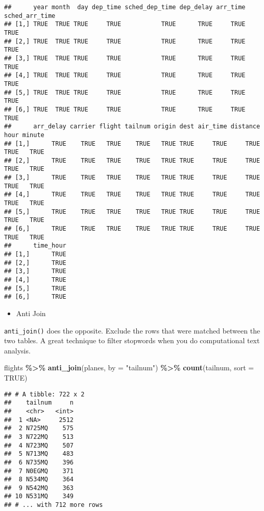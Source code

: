 \documentclass[
]{book}
\newenvironment{Shaded}{\begin{snugshade}}{\end{snugshade}}
\newcommand{\DataTypeTok}[1]{\textcolor[rgb]{0.13,0.29,0.53}{#1}}
\newcommand{\KeywordTok}[1]{\textcolor[rgb]{0.13,0.29,0.53}{\textbf{#1}}}
\newcommand{\NormalTok}[1]{#1}
\newcommand{\OperatorTok}[1]{\textcolor[rgb]{0.81,0.36,0.00}{\textbf{#1}}}
\newcommand{\OtherTok}[1]{\textcolor[rgb]{0.56,0.35,0.01}{#1}}
\newcommand{\StringTok}[1]{\textcolor[rgb]{0.31,0.60,0.02}{#1}}
\providecommand{\tightlist}{%
  \setlength{\itemsep}{0pt}\setlength{\parskip}{0pt}}
\begin{document}
\begin{verbatim}
##      year month  day dep_time sched_dep_time dep_delay arr_time sched_arr_time
## [1,] TRUE  TRUE TRUE     TRUE           TRUE      TRUE     TRUE           TRUE
## [2,] TRUE  TRUE TRUE     TRUE           TRUE      TRUE     TRUE           TRUE
## [3,] TRUE  TRUE TRUE     TRUE           TRUE      TRUE     TRUE           TRUE
## [4,] TRUE  TRUE TRUE     TRUE           TRUE      TRUE     TRUE           TRUE
## [5,] TRUE  TRUE TRUE     TRUE           TRUE      TRUE     TRUE           TRUE
## [6,] TRUE  TRUE TRUE     TRUE           TRUE      TRUE     TRUE           TRUE
##      arr_delay carrier flight tailnum origin dest air_time distance hour minute
## [1,]      TRUE    TRUE   TRUE    TRUE   TRUE TRUE     TRUE     TRUE TRUE   TRUE
## [2,]      TRUE    TRUE   TRUE    TRUE   TRUE TRUE     TRUE     TRUE TRUE   TRUE
## [3,]      TRUE    TRUE   TRUE    TRUE   TRUE TRUE     TRUE     TRUE TRUE   TRUE
## [4,]      TRUE    TRUE   TRUE    TRUE   TRUE TRUE     TRUE     TRUE TRUE   TRUE
## [5,]      TRUE    TRUE   TRUE    TRUE   TRUE TRUE     TRUE     TRUE TRUE   TRUE
## [6,]      TRUE    TRUE   TRUE    TRUE   TRUE TRUE     TRUE     TRUE TRUE   TRUE
##      time_hour
## [1,]      TRUE
## [2,]      TRUE
## [3,]      TRUE
## [4,]      TRUE
## [5,]      TRUE
## [6,]      TRUE
\end{verbatim}

\begin{itemize}
\tightlist
\item
  Anti Join
\end{itemize}

\texttt{anti\_join()} does the opposite. Exclude the rows that were matched between the two tables. A great technique to filter stopwords when you do computational text analysis.

\begin{Shaded}
\begin{Highlighting}[]
\NormalTok{flights }\OperatorTok{\%\textgreater{}\%}
\StringTok{  }\KeywordTok{anti\_join}\NormalTok{(planes, }\DataTypeTok{by =} \StringTok{"tailnum"}\NormalTok{) }\OperatorTok{\%\textgreater{}\%}
\StringTok{  }\KeywordTok{count}\NormalTok{(tailnum, }\DataTypeTok{sort =} \OtherTok{TRUE}\NormalTok{)}
\end{Highlighting}
\end{Shaded}

\begin{verbatim}
## # A tibble: 722 x 2
##    tailnum     n
##    <chr>   <int>
##  1 <NA>     2512
##  2 N725MQ    575
##  3 N722MQ    513
##  4 N723MQ    507
##  5 N713MQ    483
##  6 N735MQ    396
##  7 N0EGMQ    371
##  8 N534MQ    364
##  9 N542MQ    363
## 10 N531MQ    349
## # ... with 712 more rows
\end{verbatim}
\end{document}
